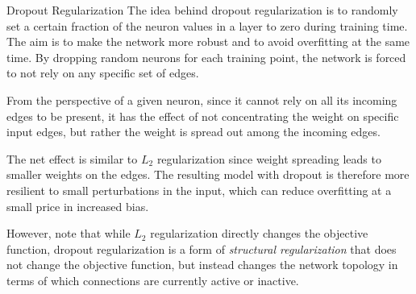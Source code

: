%
%
\begin{frame}{Dropout Regularization}
The idea behind dropout regularization is to randomly set a certain
fraction of the neuron values in a layer to zero during training time. The aim is to make the
network more robust and to avoid overfitting at the same time. By
dropping random neurons for each training point, the network is forced
to not rely on any specific set of edges. 

\medskip

From the perspective of a
given neuron, since it cannot rely on all its incoming edges to be
present, it has the effect of not concentrating the weight on specific
input edges, but rather the weight is spread out among
the incoming edges. 


\medskip

The net effect is similar to $L_2$ regularization since weight
spreading leads to smaller weights on the edges. The resulting model
with dropout is therefore more resilient to small perturbations in the
input, which can
reduce overfitting at a small price in increased bias. 

\medskip

However, note
that while $L_2$ regularization directly changes the objective function,
dropout regularization is a form of {\em structural regularization} that
does not change the objective function, but instead changes the
network topology in terms of which connections are currently active or
inactive.
\end{frame}

